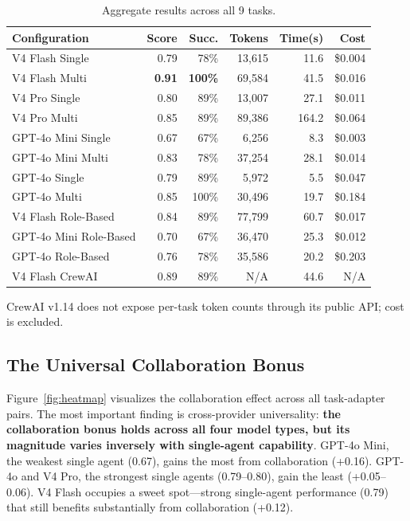 \documentclass[sigconf,nonacm]{acmart}
\begin{document}
\begin{table}[t]
\centering
\caption{Aggregate results across all 9 tasks.}
\label{tab:results}
\footnotesize
\begin{tabular}{@{}lrrrrr@{}}
\toprule
\textbf{Configuration} & \textbf{Score} & \textbf{Succ.} & \textbf{Tokens} & \textbf{Time(s)} & \textbf{Cost} \\
\midrule
V4 Flash Single & 0.79 & 78\% & 13,615 & 11.6 & \$0.004 \\
V4 Flash Multi & \textbf{0.91} & \textbf{100\%} & 69,584 & 41.5 & \$0.016 \\
V4 Pro Single & 0.80 & 89\% & 13,007 & 27.1 & \$0.011 \\
V4 Pro Multi & 0.85 & 89\% & 89,386 & 164.2 & \$0.064 \\
GPT-4o Mini Single & 0.67 & 67\% & 6,256 & 8.3 & \$0.003 \\
GPT-4o Mini Multi & 0.83 & 78\% & 37,254 & 28.1 & \$0.014 \\
GPT-4o Single & 0.79 & 89\% & 5,972 & 5.5 & \$0.047 \\
GPT-4o Multi & 0.85 & 100\% & 30,496 & 19.7 & \$0.184 \\
V4 Flash Role-Based & 0.84 & 89\% & 77,799 & 60.7 & \$0.017 \\
GPT-4o Mini Role-Based & 0.70 & 67\% & 36,470 & 25.3 & \$0.012 \\
GPT-4o Role-Based & 0.76 & 78\% & 35,586 & 20.2 & \$0.203 \\
V4 Flash CrewAI & 0.89 & 89\% & N/A & 44.6 & N/A \\
\bottomrule
\end{tabular}
\par\vspace{2pt}\footnotesize CrewAI v1.14 does not expose per-task token counts through its public API; cost is excluded.
\end{table}

\subsection{The Universal Collaboration Bonus}

Figure~\ref{fig:heatmap} visualizes the collaboration effect across all task-adapter pairs. The most important finding is cross-provider universality: \textbf{the collaboration bonus holds across all four model types, but its magnitude varies inversely with single-agent capability}. GPT-4o Mini, the weakest single agent (0.67), gains the most from collaboration (+0.16). GPT-4o and V4 Pro, the strongest single agents (0.79--0.80), gain the least (+0.05--0.06). V4 Flash occupies a sweet spot—strong single-agent performance (0.79) that still benefits substantially from collaboration (+0.12).
\end{document}
